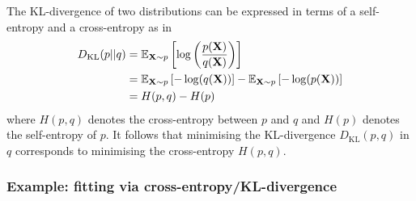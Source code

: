 \documentclass[11pt]{article}
\begin{document}
\begin{appendices}
The KL-divergence of two distributions can be expressed in terms of a self-entropy and a cross-entropy as in
\begin{align*}
    D_{\text{KL}}(p||q)
    &=
    \mathbb{E}_{\mathbf{X}\sim p}\left[\log\left(\frac{p(\mathbf{X})}{q(\mathbf{X})}\right)\right]\\
    &=
    \mathbb{E}_{\mathbf{X}\sim p}\left[-\log(q(\mathbf{X}))\right]-\mathbb{E}_{\mathbf{X}\sim p}\left[-\log(p(\mathbf{X}))\right]\\
    &=
    H(p,q)-H(p)
\end{align*}
where $H(p,q)$ denotes the cross-entropy between $p$ and $q$ and $H(p)$ denotes the self-entropy of $p$. It follows that minimising the KL-divergence $D_{\text{KL}}(p,q)$ in $q$ corresponds to minimising the cross-entropy $H(p,q)$.

\subsubsection*{Example: fitting via cross-entropy/KL-divergence}


\end{appendices}
\end{document}
